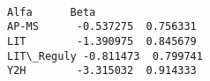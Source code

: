 \documentclass[11pt]{article}
\begin{document}
    \begin{center}
    \end{center}
    { \hspace*{\fill} \\}
    
    \begin{center}
    \end{center}
    { \hspace*{\fill} \\}
    
    \begin{center}
    \end{center}
    { \hspace*{\fill} \\}
    
    \begin{Verbatim}[commandchars=\\\{\}]
                Alfa      Beta
AP-MS      -0.537275  0.756331
LIT        -1.390975  0.845679
LIT\_Reguly -0.811473  0.799741
Y2H        -3.315032  0.914333

    \end{Verbatim}


    
    
    
    
\end{document}
